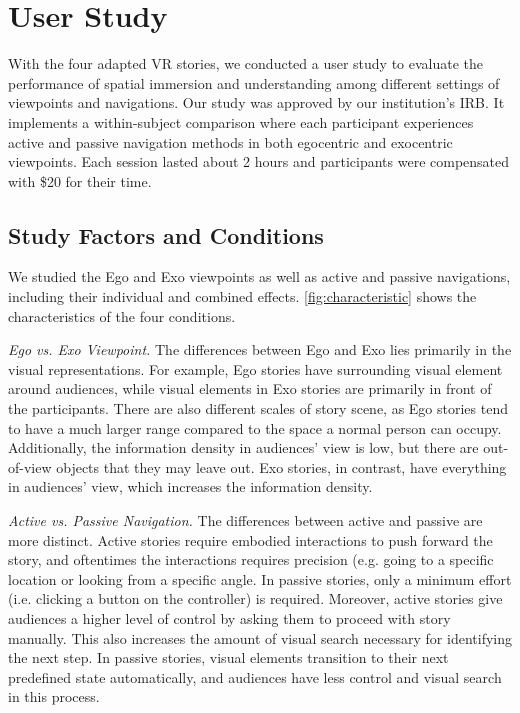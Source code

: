 \section{User Study}
\label{sec:study}

With the four adapted VR stories, we conducted a user study to evaluate the performance of spatial immersion and understanding among different settings of viewpoints and navigations.
Our study was approved by our institution's IRB. 
It implements a within-subject comparison where each participant experiences active and passive navigation methods in both egocentric and exocentric viewpoints. 
Each session lasted about 2 hours and participants were compensated with \$20 for their time.

\subsection{Study Factors and Conditions}

We studied the Ego and Exo viewpoints as well as active and passive navigations, including their individual and combined effects. \autoref{fig:characteristic} shows the characteristics of the four conditions.

\textit{Ego vs. Exo Viewpoint.} The differences between Ego and Exo lies primarily in the visual representations. For example, Ego stories have surrounding visual element around audiences, while visual elements in Exo stories are primarily in front of the participants. There are also different scales of story scene, as Ego stories tend to have a much larger range compared to the space a normal person can occupy. Additionally, the information density in audiences' view is low, but there are out-of-view objects that they may leave out. Exo stories, in contrast, have everything in audiences' view, which increases the information density.

\textit{Active vs. Passive Navigation.} The differences between active and passive are more distinct. Active stories require embodied interactions to push forward the story, and oftentimes the interactions requires precision (e.g. going to a specific location or looking from a specific angle. In passive stories, only a minimum effort (i.e. clicking a button on the controller) is required. Moreover, active stories give audiences a higher level of control by asking them to proceed with story manually. This also increases the amount of visual search necessary for identifying the next step. In passive stories, visual elements transition to their next predefined state automatically, and audiences have less control and visual search in this process.

